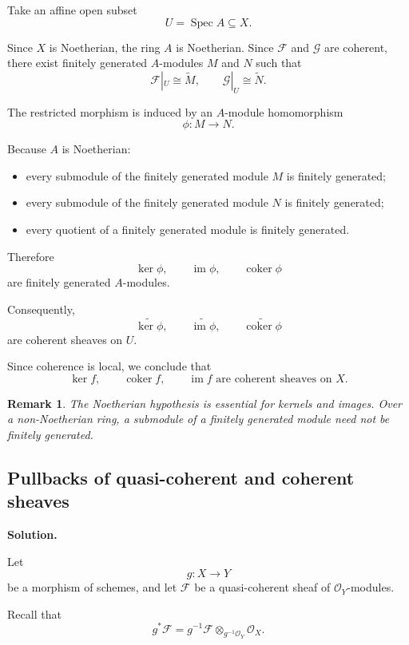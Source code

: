 \documentclass[12pt,a4paper]{article}
\DeclareMathOperator{\im}{im}
\DeclareMathOperator{\coker}{coker}
\DeclareMathOperator{\Spec}{Spec}
\newcommand{\OO}{\mathcal{O}}
\providecommand{\Spec}{\operatorname{Spec}}
\theoremstyle{notespace}
\newtheorem{remark}[definition]{Remark}
\begin{document}
Take an affine open subset
\[
U=\Spec A\subseteq X.
\]

Since \(X\) is Noetherian, the ring \(A\) is Noetherian. Since \(\mathcal{F}\) and \(\mathcal{G}\) are coherent, there exist finitely generated \(A\)-modules \(M\) and \(N\) such that
\[
\mathcal{F}|_U\cong \widetilde{M},
\qquad
\mathcal{G}|_U\cong \widetilde{N}.
\]

The restricted morphism is induced by an \(A\)-module homomorphism
\[
\phi:M\longrightarrow N.
\]

Because \(A\) is Noetherian:

\begin{itemize}
	\item every submodule of the finitely generated module \(M\) is finitely generated;
	\item every submodule of the finitely generated module \(N\) is finitely generated;
	\item every quotient of a finitely generated module is finitely generated.
\end{itemize}

Therefore
\[
\ker\phi,
\qquad
\im\phi,
\qquad
\coker\phi
\]
are finitely generated \(A\)-modules.

Consequently,
\[
\widetilde{\ker\phi},
\qquad
\widetilde{\im\phi},
\qquad
\widetilde{\coker\phi}
\]
are coherent sheaves on \(U\).

Since coherence is local, we conclude that
\[
\boxed{
	\ker f,\qquad \coker f,\qquad \im f
	\text{ are coherent sheaves on }X.
}
\]

\begin{remark}
	The Noetherian hypothesis is essential for kernels and images. Over a non-Noetherian ring, a submodule of a finitely generated module need not be finitely generated.
\end{remark}

\subsection{Pullbacks of quasi-coherent and coherent sheaves}

\textbf{Solution.}

Let
\[
g:X\longrightarrow Y
\]
be a morphism of schemes, and let \(\mathcal{F}\) be a quasi-coherent sheaf of \(\OO_Y\)-modules.

Recall that
\[
g^*\mathcal{F}
=
g^{-1}\mathcal{F}
\otimes_{g^{-1}\OO_Y}
\OO_X.
\]
\end{document}
